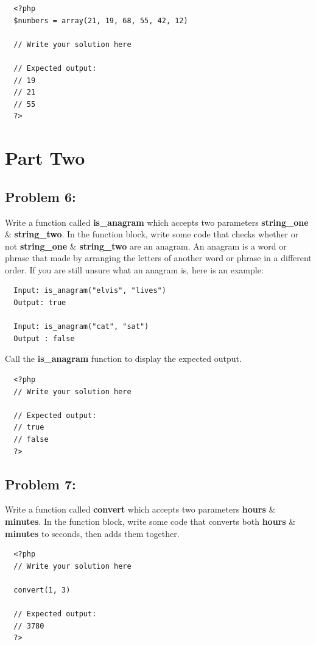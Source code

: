 \documentclass{article}
\begin{document}
\begin{verbatim}
  <?php  
  $numbers = array(21, 19, 68, 55, 42, 12) 
  
  // Write your solution here

  // Expected output:
  // 19
  // 21
  // 55
  ?>
\end{verbatim}

\section*{Part Two}

\subsection*{Problem 6:}
Write a function called \textbf{is\_anagram} which accepts two parameters \textbf{string\_one} \& \textbf{string\_two}. In the function block, write some code that checks whether or not \textbf{string\_one} \& \textbf{string\_two} are an anagram. An anagram is a word or phrase that made by arranging the letters of another word or phrase in a different order. If you are still unsure what an anagram is, here is an example:

\begin{verbatim}
  Input: is_anagram("elvis", "lives")
  Output: true

  Input: is_anagram("cat", "sat")
  Output : false
\end{verbatim}

Call the \textbf{is\_anagram} function to display the expected output.

\begin{verbatim}
  <?php  
  // Write your solution here

  // Expected output:
  // true
  // false
  ?>
\end{verbatim}

\subsection*{Problem 7:}
Write a function called \textbf{convert} which accepts two parameters \textbf{hours} \& \textbf{minutes}. In the function block, write some code that converts both \textbf{hours} \& \textbf{minutes} to seconds, then adds them together.

\begin{verbatim}
  <?php  
  // Write your solution here

  convert(1, 3)

  // Expected output:
  // 3780
  ?>
\end{verbatim}
\end{document}
